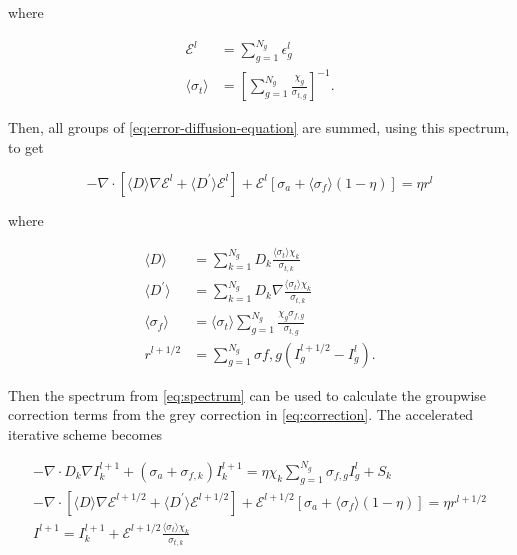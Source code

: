 \documentclass{template}
\newcommand{\E}{\mathcal{E}}
\begin{document}
where

\begin{subequations}
    \begin{align}
        \E^l &= \sum_{g=1}^{N_g}\epsilon_g^l\\
        \langle \sigma_t \rangle &= {\left[\sum_{g=1}^{N_g} \frac{\chi_g}{\sigma_{t, g}} \right]}^{-1}.
    \end{align}
\end{subequations}

Then, all groups of \autoref{eq:error-diffusion-equation} are summed, using this spectrum, to get

\begin{equation}
    \label{eq:correction}-\nabla \cdot \left[\langle D \rangle \nabla \E^l     +  \langle D^\prime \rangle  \E^l    \right]  + \E^l \left[\sigma_a + \langle \sigma_f \rangle (1 - \eta)\right] =  \eta  r^l
\end{equation}

where

\begin{subequations}
 \begin{align}
  \langle D \rangle &= \sum_{k=1}^{N_g}D_k \frac{ \langle \sigma_t \rangle \chi_k}{\sigma_{t, k}}  \\
  \langle D^\prime \rangle &= \sum_{k=1}^{N_g} D_k  \nabla   \frac{ \langle \sigma_t \rangle \chi_k}{\sigma_{t, k}}\\
  \langle \sigma_f \rangle &= \langle \sigma_t \rangle \sum_{g=1}^{N_g} \frac{\chi_g \sigma_{f, g}}{\sigma_{t, g}}\\
  r^{l+1/2} &= \sum_{g=1}^{N_g} \sigma{f, g} \left( I_g^{l+1/2} - I_g^l\right).
\end{align} 
\end{subequations}

Then the spectrum from \autoref{eq:spectrum} can be used to calculate the groupwise correction terms from the grey correction in \autoref{eq:correction}. The accelerated iterative scheme becomes

\begin{subequations}
    \begin{gather}
  \label{eq:diffusion-half-iter}-\nabla \cdot D_k \nabla I_k^{l+1} + \left( \sigma_a + \sigma_{f, k} \right)I_k^{l+1} = \eta \chi_k \sum_{g=1}^{N_g}\sigma_{f, g}I_g^l + S_k\\
  \label{eq:onegroup-error-iter}-\nabla \cdot \left[\langle D \rangle \nabla \E^{l+1/2}      +  \langle D^\prime \rangle  \E^{l+1/2}    \right]  + \E^{l+1/2}  \left[\sigma_a + \langle \sigma_f \rangle (1 - \eta)\right] =  \eta  r^{l+1/2} \\
  \label{eq:fix-diffuion}I^{l+1} = I_k^{l+1} + \E^{l+1/2}\frac{\langle \sigma_t \rangle \chi_k}{\sigma_{t, k}}
\end{gather}
\end{subequations}
\end{document}
